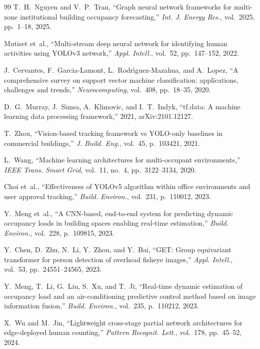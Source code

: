 \begin{thebibliography}{99}
T.~H.~Nguyen and V.~P.~Tran, ``Graph neural network frameworks for multi-zone institutional building occupancy forecasting,'' \textit{Int. J. Energy Res.}, vol.~2025, pp.~1--18, 2025.

Mutiset et~al., ``Multi-stream deep neural network for identifying human activities using YOLOv3 network,'' \textit{Appl. Intell.}, vol.~52, pp.~147--152, 2022.

J.~Cervantes, F.~Garcia-Lamont, L.~Rodr\'{\i}guez-Mazahua, and A.~Lopez, ``A comprehensive survey on support vector machine classification: applications, challenges and trends,'' \textit{Neurocomputing}, vol.~408, pp.~18--35, 2020.

D.~G.~Murray, J.~Simsa, A.~Klimovic, and I.~T.~Indyk, ``tf.data: A machine learning data processing framework,'' 2021, arXiv:2101.12127.

T.~Zhou, ``Vision-based tracking framework vs YOLO-only baselines in commercial buildings,'' \textit{J. Build. Eng.}, vol.~45, p.~103421, 2021.

L.~Wang, ``Machine learning architectures for multi-occupant environments,'' \textit{IEEE Trans. Smart Grid}, vol.~11, no.~4, pp.~3122--3134, 2020.

Choi et~al., ``Effectiveness of YOLOv5 algorithm within office environments and user approval tracking,'' \textit{Build. Environ.}, vol.~231, p.~110012, 2023.

Y.~Meng et~al., ``A CNN-based, end-to-end system for predicting dynamic occupancy loads in building spaces enabling real-time estimation,'' \textit{Build. Environ.}, vol.~228, p.~109815, 2023.

Y.~Chen, D.~Zhu, N.~Li, Y.~Zhou, and Y.~Bai, ``GET: Group equivariant transformer for person detection of overhead fisheye images,'' \textit{Appl. Intell.}, vol.~53, pp.~24551--24565, 2023.

Y.~Meng, T.~Li, G.~Liu, S.~Xu, and T.~Ji, ``Real-time dynamic estimation of occupancy load and an air-conditioning predictive control method based on image information fusion,'' \textit{Build. Environ.}, vol.~235, p.~110212, 2023.

X.~Wu and M.~Jin, ``Lightweight cross-stage partial network architectures for edge-deployed human counting,'' \textit{Pattern Recognit. Lett.}, vol.~178, pp.~45--52, 2024.


\end{thebibliography}
